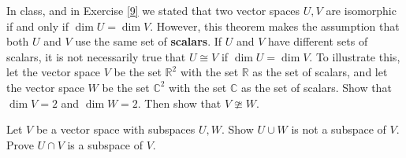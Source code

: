 \documentclass[12pt, letterpaper]{article}
\begin{document}
\begin{exercise}[Fields]
    In class, and in Exercise \ref{9} we stated that two vector spaces \(U,V\) are isomorphic if and only if \(\dim U=\dim V\). However, this theorem makes the assumption that both \(U\) and \(V\) use the same set of \textbf{scalars}. If \(U\) and \(V\) have different sets of scalars, it is not necessarily true that \(U\cong V\) if \(\dim U=\dim V\). To illustrate this, let the vector space \(V\) be the set \(\mathbb{R}^2\) with the set \(\mathbb{R}\) as the set of scalars, and let the vector space \(W\) be the set \(\mathbb{C}^2\) with the set \(\mathbb{C}\) as the set of scalars. Show that \(\dim V = 2\) and \(\dim W=2\). Then show that \(V\ncong W\).
\end{exercise}
\begin{exercise}[Subspace]
    Let \(V\) be a vector space with subspaces \(U,W\). Show \(U\cup W\) is not a subspace of \(V\). Prove \(U\cap V\) is a subspace of \(V\).
\end{exercise}
\newpage
\end{document}
